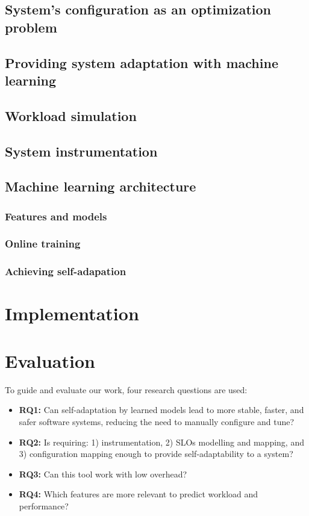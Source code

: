 \subsection{System's configuration as an optimization problem}

\subsection{Providing system adaptation with machine learning}

\subsection{Workload simulation}

\subsection{System instrumentation}

\subsection{Machine learning architecture}

\subsubsection{Features and models}

\subsubsection{Online training}

\subsubsection{Achieving self-adapation}

\section{Implementation}

\section{Evaluation}

To guide and evaluate our work, four research questions are used:

\begin{itemize}
  \item \textbf{RQ1:} Can self-adaptation by learned models lead to more stable, faster, and safer software systems, reducing the need to manually configure and tune?
  \item \textbf{RQ2:} Is requiring: 1) instrumentation, 2) SLOs modelling and mapping, and 3) configuration mapping enough to provide self-adaptability to a system? 
  \item \textbf{RQ3:} Can this tool work with low overhead?
  \item \textbf{RQ4:} Which features are more relevant to predict workload and performance?
\end{itemize}

